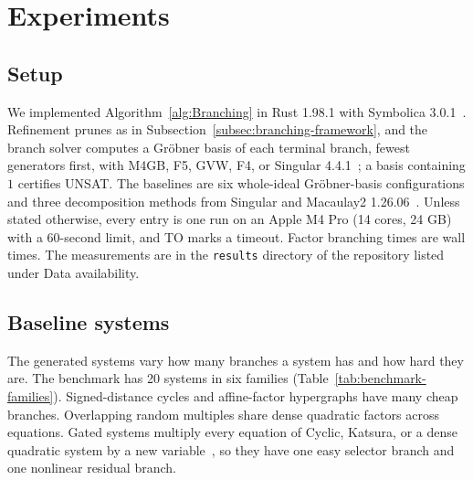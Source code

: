 \section{Experiments}
\label{sec:experiments}

\subsection{Setup}
\label{subsec:experimental-setup}

We implemented Algorithm~\ref{alg:Branching} in Rust 1.98.1 with Symbolica
3.0.1~\cite{ruijl2023symbolica}. Refinement prunes as in
Subsection~\ref{subsec:branching-framework}, and the branch solver computes a
Gr\"obner basis of each terminal branch, fewest generators first, with M4GB,
F5, GVW, F4, or Singular 4.4.1~\cite{makarim2017m4gb,faugere2002f5,
gao2016gvw,faugere1999f4,singular2025}; a basis containing $1$ certifies
UNSAT. The baselines are six whole-ideal Gr\"obner-basis configurations and
three decomposition methods from Singular and Macaulay2
1.26.06~\cite{singular2025,macaulay2}. Unless stated otherwise, every entry is one run on an Apple M4
Pro (14 cores, 24 GB) with a 60-second limit, and TO marks a timeout. Factor
branching times are wall times. The measurements are in the \texttt{results} directory of the
repository listed under Data availability.

\subsection{Baseline systems}
\label{subsec:baseline-systems}

The generated systems vary how many branches a system has and how hard they
are. The benchmark has 20 systems in six families
(Table~\ref{tab:benchmark-families}). Signed-distance cycles and affine-factor
hypergraphs have many cheap branches. Overlapping random multiples share dense
quadratic factors across equations. Gated systems multiply every equation of
Cyclic, Katsura, or a dense quadratic system by a new
variable~\cite{bjorck1991cyclic,boege1986examples}, so they have one easy
selector branch and one nonlinear residual branch.

